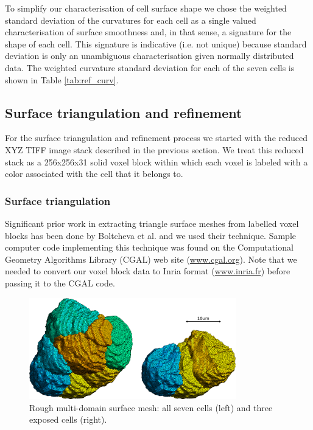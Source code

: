 \documentclass[a4paper,10pt]{article}
\begin{document}
To simplify our characterisation of cell surface shape we chose the weighted standard deviation of the curvatures for each cell as a single valued characterisation of surface smoothness and, in that sense, a signature for the shape of each cell.
This signature is indicative (i.e. not unique) because standard deviation is only an unambiguous characterisation given normally distributed data.
The weighted curvature standard deviation for each of the seven cells is shown in Table \ref{tab:ref_curv}.\\ 

\subsection{Surface triangulation and refinement}

For the surface triangulation and refinement process we started with the reduced XYZ TIFF image stack described in the previous section. We treat this reduced stack as a 256x256x31 solid voxel block within which each voxel is labeled with a color associated with the cell that it belongs to. 

\subsubsection{Surface triangulation}

Significant prior work in extracting triangle surface meshes from labelled voxel blocks has been done by Boltcheva et al.\cite{boltcheva:inria-00420228} and we used their technique. Sample computer code implementing this technique was found on the Computational Geometry Algorithms Library (CGAL) web site (\url{www.cgal.org}). Note that we needed to convert our voxel block data to Inria format (\url{www.inria.fr}) before passing it to the CGAL code.

\begin{figure}[H]
\begin{center}
\includegraphics[width=0.8\textwidth]{images/rough.pdf}
\end{center}
\caption{Rough multi-domain surface mesh: all seven cells (left) and three exposed cells (right).}
\label{fig:rough}
\end{figure}
\end{document}
